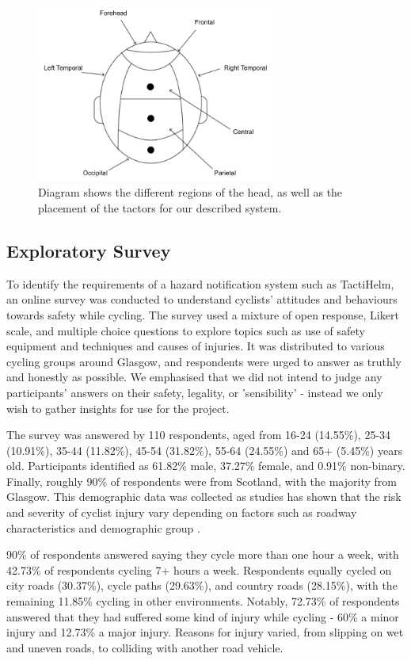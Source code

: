 \documentclass{interim}
\begin{document}
\begin{figure}[!ht]
    \centering
    \includegraphics[width=0.70\textwidth]{images/head-regions.drawio.pdf}
    \caption{Diagram shows the different regions of the head, as well as the placement of the tactors for our described system.}
    \label{fig:head-regions}
\end{figure}


\subsection{Exploratory Survey}\label{sec:survey}
To identify the requirements of a hazard notification system such as TactiHelm, an online survey was conducted to understand cyclists' attitudes and behaviours towards safety while cycling. The survey used a mixture of open response, Likert scale, and multiple choice questions to explore topics such as use of safety equipment and techniques and causes of injuries. It was distributed to various cycling groups around Glasgow, and respondents were urged to answer as truthly and honestly as possible. We emphasised that we did not intend to judge any participants' answers on their safety, legality, or 'sensibility' - instead we only wish to gather insights for use for the project.

The survey was answered by 110 respondents, aged from 16-24 (14.55\%), 25-34 (10.91\%), 35-44 (11.82\%), 45-54 (31.82\%), 55-64 (24.55\%) and 65+ (5.45\%) years old. Participants identified as 61.82\% male, 37.27\% female, and 0.91\% non-binary. Finally, roughly 90\% of respondents were from Scotland, with the majority from Glasgow. This demographic data was collected as studies has shown that the risk and severity of cyclist injury vary depending on factors such as roadway characteristics and demographic group \cite{BEHNOOD201735}.

90\% of respondents answered saying they cycle more than one hour a week, with 42.73\% of respondents cycling 7+ hours a week. Respondents equally cycled on city roads (30.37\%), cycle paths (29.63\%), and country roads (28.15\%), with the remaining 11.85\% cycling in other environments. Notably, 72.73\% of respondents answered that they had suffered some kind of injury while cycling - 60\% a minor injury and 12.73\% a major injury. Reasons for injury varied, from slipping on wet and uneven roads, to colliding with another road vehicle.
\end{document}
